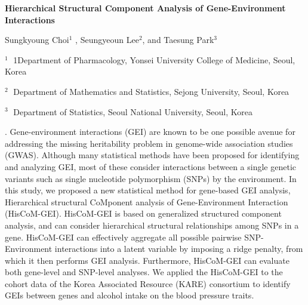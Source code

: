 \documentclass[12pt]{article}
\begin{document}
\begin{flushleft}


{\LARGE\bf Hierarchical Structural Component Analysis of Gene-Environment Interactions}


\vspace{1.0cm}

Sungkyoung Choi$^1$ , Seungyeoun Lee$^2$, and Taesung Park$^3$

\begin{description}

\item $^1 \;$ 1Department of Pharmacology, Yonsei University College of Medicine, Seoul, Korea

\item $^2 \;$ Department of Mathematics and Statistics, Sejong University,
Seoul, Korea

\item $^3 \;$ Department of  Statistics, Seoul National University,
Seoul, Korea

\end{description}

\end{flushleft}


\vspace{0.75cm}

. Gene-environment interactions (GEI) are known to be one possible avenue for addressing the missing heritability problem in genome-wide association studies (GWAS). Although many statistical methods have been proposed for identifying and analyzing GEI, most of these consider interactions between a single genetic variants such as single nucleotide polymorphism (SNPs) by the environment. In this study, we proposed a new statistical method for gene-based GEI analysis, Hierarchical structural CoMponent analysis of Gene-Environment Interaction (HisCoM-GEI). HisCoM-GEI is based on generalized structured component analysis, and can consider hierarchical structural relationships among SNPs in a gene. HisCoM-GEI can effectively aggregate all possible pairwise SNP-Environment interactions into a latent variable by imposing a ridge penalty, from which it then performs GEI analysis. Furthermore, HisCoM-GEI can evaluate both gene-level and SNP-level analyses. We applied the HisCoM-GEI to the cohort data of the Korea Associated Resource (KARE) consortium to identify GEIs between genes and alcohol intake on the blood pressure traits.
\end{document}
